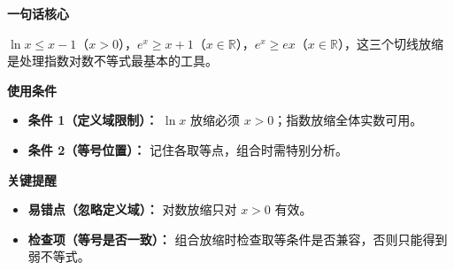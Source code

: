 \begin{summarybox}
	\textbf{\textcolor{CSummary}{一句话核心}}

	$\ln x \le x-1$（$x>0$），$e^x \ge x+1$（$x\in\mathbb{R}$），$e^x \ge ex$（$x\in\mathbb{R}$），这三个切线放缩是处理指数对数不等式最基本的工具。

	\medskip
	\textbf{\textcolor{CSummary}{使用条件}}
	\begin{itemize}[leftmargin=*, itemsep=0.5em, topsep=0.4em]
		\item \textbf{条件 1（定义域限制）：} $\ln x$ 放缩必须 $x>0$；指数放缩全体实数可用。
		\item \textbf{条件 2（等号位置）：} 记住各取等点，组合时需特别分析。
	\end{itemize}

	\medskip
	\textbf{\textcolor{CSummary}{关键提醒}}
	\begin{itemize}[leftmargin=*, itemsep=0.5em, topsep=0.4em]
		\item \textbf{易错点（忽略定义域）：} 对数放缩只对 $x>0$ 有效。
		\item \textbf{检查项（等号是否一致）：} 组合放缩时检查取等条件是否兼容，否则只能得到弱不等式。
	\end{itemize}
\end{summarybox}
